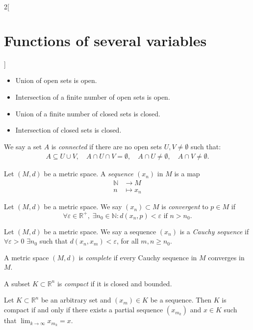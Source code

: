 \documentclass[class=article,10pt,crop=false]{standalone}
\begin{document}
\begin{multicols}{2}[\section{Functions of several variables}]
\begin{prop}
\hfill
\begin{itemize}
    \item Union of open sets is open.
    \item Intersection of a finite number of open sets is open.
    \item Union of a finite number of closed sets is closed.
    \item Intersection of closed sets is closed.
\end{itemize}
\end{prop}
\begin{definition}
We say a set $A$ is \textit{connected} if there are no open sets $U,V\ne\emptyset$ such that: 
\begin{gather*}
    A\subseteq U\cup V,\quad A\cap U\cap V=\emptyset,\quad A\cap U\ne\emptyset,\quad A\cap V\ne\emptyset.
\end{gather*}
\end{definition}
\begin{definition}
Let $(M,d)$ be a metric space. A \textit{sequence $(x_n)$} in $M$ is a map
\begin{align*}
    \mathbb{N}&\longrightarrow M\\
    n&\longmapsto x_n
\end{align*}
\end{definition}
\begin{definition}
Let $(M,d)$ be a metric space. We say $(x_n)\subset M$ is \textit{convergent} to $p\in M$ if $$\forall\varepsilon\in\mathbb{R}^+,\;\exists n_0\in\mathbb{N}:d(x_n,p)<\varepsilon\text{ if }n>n_0.$$
\end{definition}
\begin{definition}
Let $(M,d)$ be a metric space. We say a sequence $(x_n)$ is a \textit{Cauchy sequence} if $\forall\varepsilon>0$ $\exists n_0$ such that $d(x_n,x_m)<\varepsilon$, for all $m,n\geq n_0$.
\end{definition}
\begin{definition}
A metric space $(M,d)$ is \textit{complete} if every Cauchy sequence in $M$ converges in $M$.
\label{FOSV_complete}
\end{definition}
\begin{definition}
A subset $K\subset\mathbb{R}^n$ is \textit{compact} if it is closed and bounded.
\end{definition}
\begin{theorem}
Let $K\subset\mathbb{R}^n$ be an arbitrary set and $(x_m)\in K$ be a sequence. Then $K$ is compact if and only if there exists a partial sequence $(x_{m_k})$ and $x\in K$ such that $\displaystyle\lim_{k\to\infty}x_{m_k}=x$.
\end{theorem}

\end{multicols}
\end{document}
